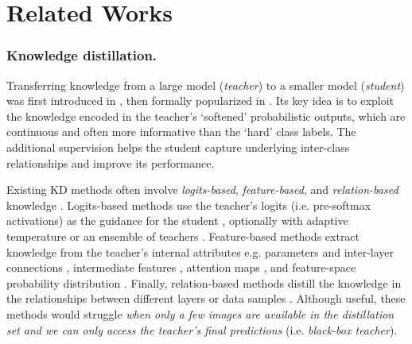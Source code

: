 \section{Related Works} \label{sec:32-research01-related}

\subsubsection{Knowledge distillation.}
\begin{foldable}
    Transferring knowledge from a large model (\textit{teacher}) to a smaller model (\textit{student}) was first introduced in \cite{bucilua2006model}, then formally popularized in \cite{hinton2015distilling}.
    Its key idea is to exploit the knowledge encoded in the teacher's `softened' probabilistic outputs, which are continuous and often more informative than the `hard' class labels.
    The additional supervision helps the student capture underlying inter-class relationships and improve its performance.
\end{foldable}

\begin{foldable}
    Existing KD methods often involve \textit{logits-based}, \textit{feature-based}, and \textit{relation-based} knowledge \cite{gou2021knowledge}.
    Logits-based methods use the teacher's logits (i.e. pre-softmax activations) as the guidance for the student \cite{ba2014deep,hinton2015distilling,nguyen2021knowledge}, optionally with adaptive temperature \cite{li2023curriculum} or an ensemble of teachers \cite{guo2020online}.
    Feature-based methods extract knowledge from the teacher's internal attributes e.g. parameters and inter-layer connections \cite{liu2019knowledge}, intermediate features \cite{romero2014fitnets}, attention maps \cite{zagoruyko2016paying}, and feature-space probability distribution \cite{passalis2018learning}.
    Finally, relation-based methods distill the knowledge in the relationships between different layers or data samples \cite{park2019relational,yim2017gift,chen2020learning}.
    Although useful, these methods would struggle \textit{when only a few images are available in the distillation set and we can only access the teacher's final predictions} (i.e. \textit{black-box teacher}).
\end{foldable}

